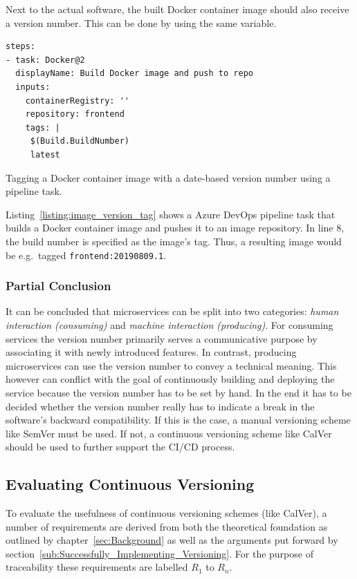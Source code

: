 Next to the actual software, the built Docker container image should also
receive a version number. This can be done by using the same variable.

\begin{listing}[H]
  \begin{verbatim}
steps:
- task: Docker@2
  displayName: Build Docker image and push to repo
  inputs:
    containerRegistry: ''
    repository: frontend
    tags: |
     $(Build.BuildNumber)
     latest
  \end{verbatim}
  \caption{Tagging a Docker container image with a date-based version number
  using a pipeline task.}%
  \label{listing:image_version_tag}
\end{listing}

Listing~\ref{listing:image_version_tag} shows a Azure DevOps pipeline task that
builds a Docker container image and pushes it to an image repository. In line
8, the build number is specified as the image's tag. Thus, a resulting image
would be e.g.\ tagged \texttt{frontend:20190809.1}.

\subsubsection{Partial Conclusion}%
\label{ssub:Partial_Conclusion}
It can be concluded that microservices can be split into two categories:
\textit{human interaction (consuming)} and \textit{machine interaction
(producing)}. For consuming services the version number primarily serves a
communicative purpose by associating it with newly introduced features. In
contrast, producing microservices can use the version number to convey a
technical meaning. This however can conflict with the goal of continuously
building and deploying the service because the version number has to be set by
hand. In the end it has to be decided whether the version number really has to
indicate a break in the software's backward compatibility. If this is the case,
a manual versioning scheme like SemVer must be used. If not, a continuous
versioning scheme like CalVer should be used to further support the
\ac{CI}/\ac{CD} process.

\subsection{Evaluating Continuous Versioning}%
\label{sub:Evaluating_Continuous_Versioning}
To evaluate the usefulness of continuous versioning schemes (like CalVer), a
number of requirements are derived from both the theoretical foundation as
outlined by chapter~\ref{sec:Background} as well as the arguments put forward
by section~\ref{sub:Successfully_Implementing_Versioning}. For the purpose of
traceability these requirements are labelled $R_1$ to $R_n$.

